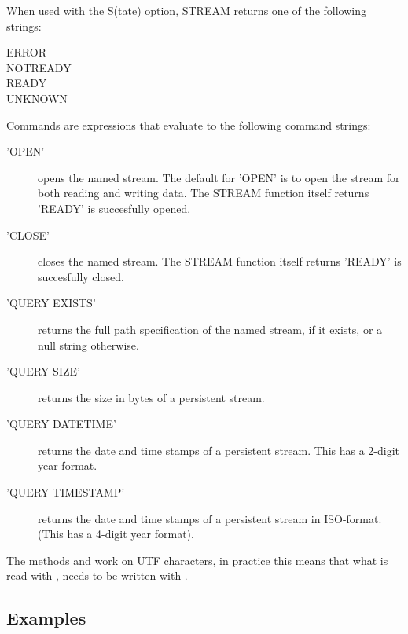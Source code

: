 \begin{description}
When used with the S(tate) option, STREAM
returns one of the following strings:
\begin{description}
\item[ERROR]
\item[NOTREADY]
\item[READY]
\item[UNKNOWN]
\end{description}

Commands are expressions that evaluate to the following command
strings:
\begin{description}
  \item['OPEN'] opens the named stream. The default for 'OPEN' is to
    open the stream for both reading and writing data. The STREAM function itself
    returns 'READY' is succesfully opened.
  \item['CLOSE'] closes the named stream. The STREAM function itself
    returns 'READY' is succesfully closed.
  \item['QUERY EXISTS'] returns the full path specification of the
    named stream, if it exists, or a null string otherwise.
  \item['QUERY SIZE'] returns the size in bytes of a persistent
    stream.
  \item['QUERY DATETIME'] returns the date and time stamps of a
    persistent stream. This has a 2-digit year format.
  \item['QUERY TIMESTAMP'] returns the date and time stamps of a
    persistent stream in ISO-format. (This has a 4-digit year format).
  \end{description}
\end{description}

The methods  and  work on UTF
characters, in practice this means that what is read with
, needs to be written with .


\subsection{Examples}

